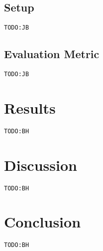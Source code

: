 \documentclass{llncs}
\newcommand{\todo}[1]{\texttt{\color{red}TODO:#1}}
\begin{document}
\subsection{Setup}
\todo{JB}

\subsection{Evaluation Metric}
\todo{JB}

\section{Results}
\todo{BH}

\section{Discussion}
\todo{BH}

\section{Conclusion}
\label{sec:Conclusion}
\todo{BH}




\end{document}
